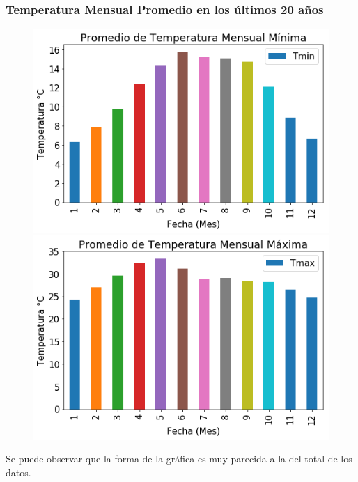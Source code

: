 \documentclass{article}
\begin{document}
\subsubsection{Temperatura Mensual Promedio en los últimos 20 años}
\begin{figure}[h]
\centering
  \begin{minipage}{0.4\textwidth}
    \centering
    \includegraphics[width=1\textwidth]{GTmin20.png}
  \end{minipage}
  \hspace{5mm}
  \begin{minipage}{0.4\textwidth}
    \centering
    \includegraphics[width=1\textwidth]{GTmax20.png}
  \end{minipage}
\end{figure}
Se puede observar que la forma de la gráfica es muy parecida a la del total de los datos.
\end{document}

